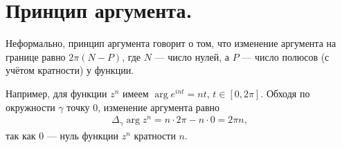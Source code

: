 \documentclass[../../main.tex]{subfiles}
\begin{document}
 
\newpage
\section{Принцип аргумента.}

Неформально, принцип аргумента говорит о том, что изменение аргумента на границе равно $ 2\pi(N - P) $, где $ N $ --- число нулей, а $ P $ --- число полюсов (с учётом кратности) у функции.

Например, для функции $ z^{n} $ имеем $ \arg e^{int} = nt $, $ t \in [0,2\pi] $. Обходя по окружности $ \gamma $ точку $ 0 $, изменение аргумента равно
\begin{align*}
 \Delta_\gamma \arg z^{n} = n \cdot 2\pi - n \cdot 0 = 2\pi n,
\end{align*} так как $ 0 $ --- нуль функции $ z^{n} $ кратности $ n $.
\end{document}
